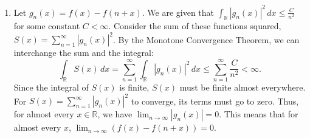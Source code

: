 \documentclass{article}
\begin{document}
\begin{enumerate}[label=\fbox{\arabic*}]
\begin{enumerate}[label=(\arabic*)]
          \item We have $A = \{x_5 = x_6 = x_7 = 0\}$ and $B = \{x_1 = x_2 = x_3 = 0\}$.
          Let $U = (x_1, x_2, x_3) \in \mathbb{R}^3$, $v = x_4 \in \mathbb{R}$, and $W = (x_5, x_6, x_7) \in \mathbb{R}^3$.
          Then $S^6 = \{ \|U\|^2 + v^2 + \|W\|^2 = 1 \}$.
          The condition $X \setminus (A \cup B)$ means we remove the points where $\|U\| = 0$ (which is $B$) and $\|W\| = 0$ (which is $A$). Thus on this space, $\|U\| > 0$ and $\|W\| > 0$.
          We can deformation retract this space by continuously scaling the unconstrained coordinate $v \to 0$ and renormalizing. The resulting space is:
          \[
            Y = \{ (U, 0, W) \in \mathbb{R}^7 \mid \|U\|^2 + \|W\|^2 = 1, \, \|U\| > 0, \, \|W\| > 0 \}.
          \]
          We can map any point in $Y$ to $(u, w, s) \in S^2 \times S^2 \times (0, 1)$ via $u = U/\|U\|$, $w = W/\|W\|$, and $s = \|U\|^2$. This map is a homeomorphism, so $Y \cong S^2 \times S^2 \times (0, 1)$.
          Since $(0, 1)$ is contractible, $Y$ is homotopy equivalent to $S^2 \times S^2$.
          Using the Künneth formula, the homology groups of $S^2 \times S^2$ are:
          \begin{align*}
            H_0(S^6 \setminus (A \cup B)) &= \mathbb{Z} \\
            H_2(S^6 \setminus (A \cup B)) &= \mathbb{Z} \oplus \mathbb{Z} \\
            H_4(S^6 \setminus (A \cup B)) &= \mathbb{Z}
          \end{align*}
          with $H_k = 0$ for all $k \notin \{0, 2, 4\}$.
        \end{enumerate}

  \item %
        Let $g_n(x) = f(x) - f(n+x)$. We are given that $\int_{\mathbb{R}} |g_n(x)|^2 \, dx \le \frac{C}{n^2}$ for some constant $C < \infty$.
        Consider the sum of these functions squared, $S(x) = \sum_{n=1}^\infty |g_n(x)|^2$. By the Monotone Convergence Theorem, we can interchange the sum and the integral:
        \[
          \int_{\mathbb{R}} S(x) \, dx = \sum_{n=1}^\infty \int_{\mathbb{R}} |g_n(x)|^2 \, dx \le \sum_{n=1}^\infty \frac{C}{n^2} < \infty.
        \]
        Since the integral of $S(x)$ is finite, $S(x)$ must be finite almost everywhere. 
        For $S(x) = \sum_{n=1}^\infty |g_n(x)|^2$ to converge, its terms must go to zero. Thus, for almost every $x \in \mathbb{R}$, we have $\lim_{n\to\infty} |g_n(x)| = 0$. 
        This means that for almost every $x$, $\lim_{n\to\infty} (f(x) - f(n+x)) = 0$.
        

\end{enumerate}
\end{document}
